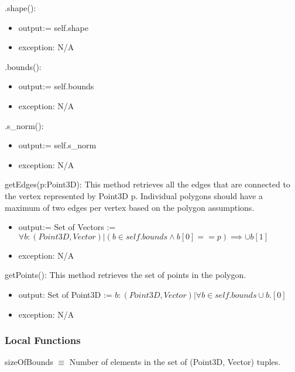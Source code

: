 \documentclass[12pt, titlepage]{article}
\begin{document}
\noindent .shape():
\begin{itemize}
	\item output:= self.shape
	\item exception: N/A
\end{itemize}

\noindent .bounds():
\begin{itemize}
	\item output:= self.bounds
	\item exception: N/A
\end{itemize}

\noindent .s\_norm():
\begin{itemize}
	\item output:= self.s\_norm
	\item exception: N/A
\end{itemize}

\noindent getEdges(p:Point3D):
This method retrieves all the edges that are connected to the vertex 
represented by Point3D p. Individual polygons should have a maximum of two 
edges per vertex based on the polygon assumptions.
\begin{itemize}
	\item output:= Set of Vectors := $\forall b : (Point3D,Vector) | (b \in 
	self.bounds \wedge b[0] == p) \implies \cup b[1] $
	\item exception: N/A
\end{itemize}

\noindent getPoints():
This method retrieves the set of points in the polygon.
\begin{itemize}
	\item output: Set of Point3D := $b: (Point3D, Vector)| \forall b \in 
	self.bounds  \cup b.[0]$
	\item exception: N/A
\end{itemize}


\subsubsection{Local Functions}
sizeOfBounds $\equiv$ Number of elements in the set of (Point3D, Vector) 
tuples.\\


\newpage
\end{document}
